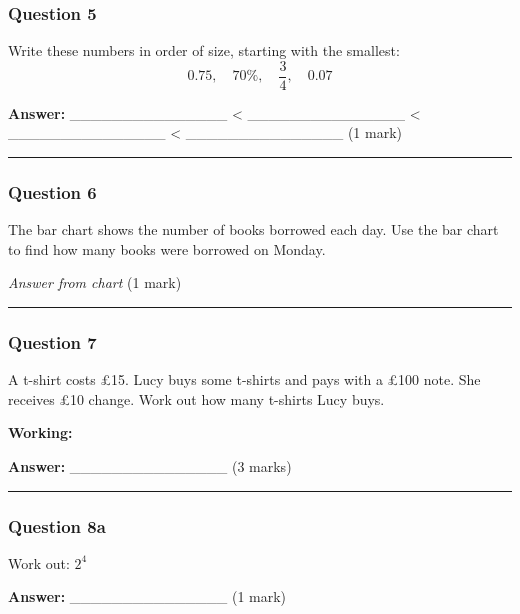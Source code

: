\subsubsection{Question 5}\label{question-5}

Write these numbers in order of size, starting with the smallest:
\[0.75, \quad 70\%, \quad \frac{3}{4}, \quad 0.07\]

\textbf{Answer:} \_\_\_\_\_\_\_\_\_\_\_\_\_\_\_ \textless{}
\_\_\_\_\_\_\_\_\_\_\_\_\_\_\_ \textless{}
\_\_\_\_\_\_\_\_\_\_\_\_\_\_\_ \textless{}
\_\_\_\_\_\_\_\_\_\_\_\_\_\_\_ (1 mark)

\begin{center}\rule{0.5\linewidth}{0.5pt}\end{center}

\subsubsection{Question 6}\label{question-6}

The bar chart shows the number of books borrowed each day. Use the bar
chart to find how many books were borrowed on Monday.

\emph{Answer from chart} (1 mark)

\begin{center}\rule{0.5\linewidth}{0.5pt}\end{center}

\subsubsection{Question 7}\label{question-7}

A t-shirt costs £15. Lucy buys some t-shirts and pays with a £100 note.
She receives £10 change. Work out how many t-shirts Lucy buys.

\textbf{Working:}

\textbf{Answer:} \_\_\_\_\_\_\_\_\_\_\_\_\_\_\_ (3 marks)

\begin{center}\rule{0.5\linewidth}{0.5pt}\end{center}

\subsubsection{Question 8a}\label{question-8a}

Work out: \(2^4\)

\textbf{Answer:} \_\_\_\_\_\_\_\_\_\_\_\_\_\_\_ (1 mark)

